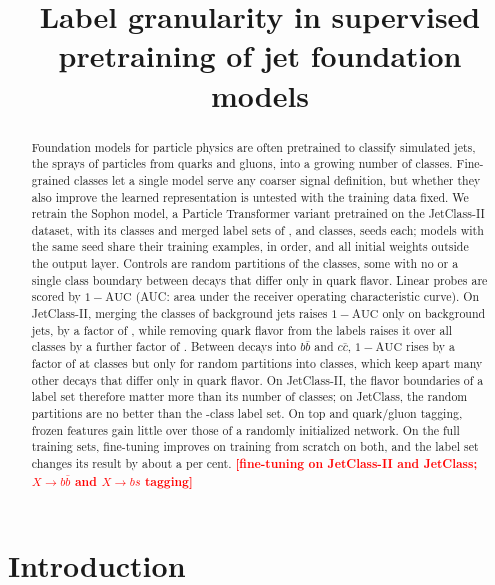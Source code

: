 \documentclass[11pt]{article}
\title{Label granularity in supervised pretraining of jet foundation models}
\author{\pending{author list}}
\date{}
\newcommand{\pending}[1]{\textcolor{red}{\textbf{[#1]}}}
\newcommand{\Kfull}{\VocabSizeLoneeighteight}
\newcommand{\Kres}{\VocabSizeLonesixtwo}
\newcommand{\Kmid}{\VocabSizeRfourtwoQone}
\newcommand{\Kcoarse}{\VocabSizeRonesixQone}
\newcommand{\oma}{\ensuremath{1-\mathrm{AUC}}}
\begin{document}
\maketitle

\begin{abstract}
Foundation models for particle physics are often pretrained to classify simulated jets, the
sprays of particles from quarks and gluons, into a growing number of classes. Fine-grained
classes let a single model serve any coarser signal definition, but whether they also improve
the learned representation is untested with the training data fixed. We retrain the Sophon
model, a Particle Transformer variant pretrained on the JetClass-II dataset, with its
\Kfull{} classes and merged label sets of \Kres, \Kmid{} and \Kcoarse{} classes,
\MlstNRunsWord{} seeds each; models with the same seed share their training examples, in order,
and all initial weights outside the output layer. Controls are random partitions of the
classes, some with no or a single class boundary between decays that differ only in quark
flavor. Linear probes are scored by $\oma$ (AUC: area under the receiver
operating characteristic curve). On
JetClass-II, merging the classes of background jets raises $\oma$ only on background jets, by a
factor of \MlstCmpJcTwoQcdResOverFull, while removing quark flavor from the labels raises it
over all classes by a further factor of \MlstCmpJcTwoCoarseOverRes. Between decays into
$b\bar b$ and $c\bar c$, $\oma$ rises by a factor of \MlstCmpBbCoarseOverFull{} at \Kcoarse{}
classes but only \MlstCmpBbRandOverFull{} for random partitions into \Kcoarse{} classes, which
keep apart many other decays that differ only in quark flavor. On JetClass-II, the flavor
boundaries of a label set therefore matter more than its number of classes; on JetClass, the
random partitions are no better than the \Kcoarse-class label set. On top and quark/gluon
tagging, frozen features gain little over those of a randomly initialized network. On the full
training sets, fine-tuning improves on training from scratch on both, and the label set changes
its result by about a per cent.
\pending{fine-tuning on JetClass-II and JetClass; $X\to b\bar b$ and $X\to bs$ tagging}
\end{abstract}

\section{Introduction}
\end{document}
